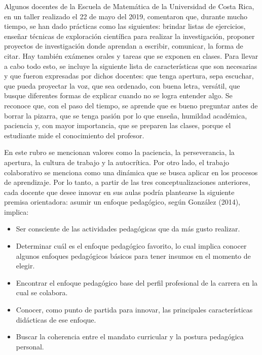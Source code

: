 Algunos docentes de la Escuela de Matemática de la Universidad de Costa Rica, en un taller realizado el 22 de mayo del 2019, comentaron que, durante mucho tiempo, se han dado prácticas como las siguientes: brindar listas de ejercicios, enseñar técnicas de exploración científica para realizar la investigación, proponer proyectos de investigación donde aprendan a escribir, comunicar, la forma de citar. Hay también exámenes orales y tareas que se exponen en clases. Para llevar a cabo todo esto, se incluye la siguiente lista de características que son necesarias y que fueron expresadas por dichos docentes: que tenga apertura, sepa escuchar, que pueda proyectar la voz, que sea ordenado, con buena letra, versátil, que busque diferentes formas de explicar cuando no se logra entender algo. Se reconoce que, con el paso del tiempo, se aprende que es bueno preguntar antes de borrar la pizarra, que se tenga pasión por lo que enseña, humildad académica, paciencia y, con mayor importancia, que se preparen las clases, porque el estudiante mide el conocimiento del profesor. 

En este rubro se mencionan valores como la paciencia, la perseverancia, la apertura, la cultura de trabajo y la autocrítica. Por otro lado, el trabajo colaborativo se menciona como una dinámica que se busca aplicar en los procesos de aprendizaje.  Por lo tanto, a partir de las tres conceptualizaciones anteriores, cada docente que desee innovar en sus aulas podría plantearse la siguiente premisa orientadora: asumir un enfoque pedagógico, según González (2014), implica: 

\begin{itemize}
    
    \color{blue} \item \color{black} Ser consciente de las actividades pedagógicas que da más gusto realizar.

     \color{blue} \item \color{black} Determinar cuál es el enfoque pedagógico favorito, lo cual implica conocer algunos enfoques pedagógicos básicos para tener insumos en el momento de elegir.
     
    \color{blue} \item \color{black} Encontrar el enfoque pedagógico base del perfil profesional de la carrera en la cual se colabora.
    
    \color{blue} \item \color{black} Conocer, como punto de partida para innovar, las principales características didácticas de ese enfoque. 
    
    \color{blue} \item \color{black} Buscar la coherencia entre el mandato curricular y la postura pedagógica personal. 
    \end{itemize}

